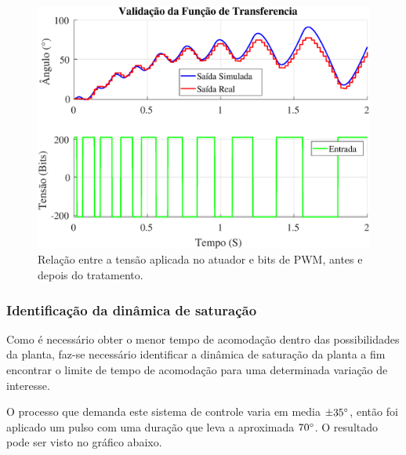 \documentclass[conference,harvard,brazil,english]{sbatex}
\begin{document}
                \begin{figure}[!htb] 
                \centering \includegraphics[width=\columnwidth]{imagens/valida.eps}{
                    \small
                    \centering
                    \caption{Relação entre a tensão aplicada no atuador e bits de PWM, antes e depois do tratamento.}
                    \label{ZonaMorta}}
                \end{figure}
                
    
            \subsubsection{Identificação da dinâmica de saturação}
                
                Como é necessário obter o menor tempo de acomodação dentro das possibilidades da planta, faz-se necessário identificar a dinâmica de saturação da planta a fim encontrar o limite de tempo de acomodação para uma determinada variação de interesse.
                
                O processo que demanda este sistema de controle varia em media $\pm35\degree$, então foi aplicado um pulso com uma duração que leva a aproximada $70\degree$. O resultado pode ser visto no gráfico abaixo.
                
\end{document}
